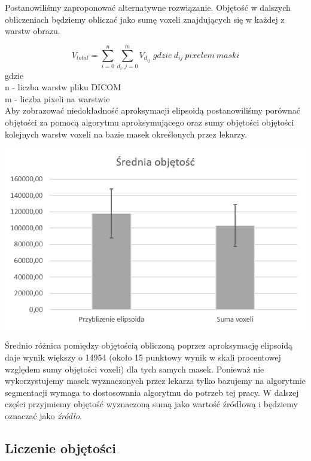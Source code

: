 \documentclass[a4paper,11pt,twoside]{report}
\theoremstyle{definition}
\begin{document}
\par
Postanowiliśmy zaproponować alternatywne rozwiązanie. Objętość w dalszych obliczeniach będziemy obliczać jako sumę voxeli znajdujących się w każdej z warstw obrazu. 

\[ V_{total} = \sum_{i=0}^{n} \sum_{d_i, j=0}^{m} V_{d_{ij}} \ gdzie\ d_{ij}\ pixelem\ maski \]
gdzie \\
n - liczba warstw pliku DICOM \\
m - liczba pixeli na warstwie \\

Aby zobrazować niedokładność aproksymacji elipsoidą postanowiliśmy porównać objętości za pomocą algorytmu aproksymującego oraz sumy objętości objętości kolejnych warstw voxeli na bazie masek określonych przez lekarzy. 

\begin{minipage}{\linewidth}
	\centering
	\includegraphics[width=\textwidth]{WstepObjetosc.png}
\end{minipage}

Średnio różnica pomiędzy objętością obliczoną poprzez aproksymację elipsoidą daje wynik większy o 14954 (około 15 punktowy wynik w skali procentowej względem sumy objętości voxeli) dla tych samych masek. Ponieważ nie wykorzystujemy masek wyznaczonych przez lekarza tylko bazujemy na algorytmie segmentacji wymaga to dostosowania algorytmu do potrzeb tej pracy. W dalszej części przyjmiemy objętość wyznaczoną sumą jako wartość źródłową i będziemy oznaczać jako \textit{źródło}.

\subsection{Liczenie objętości}
\end{document}
